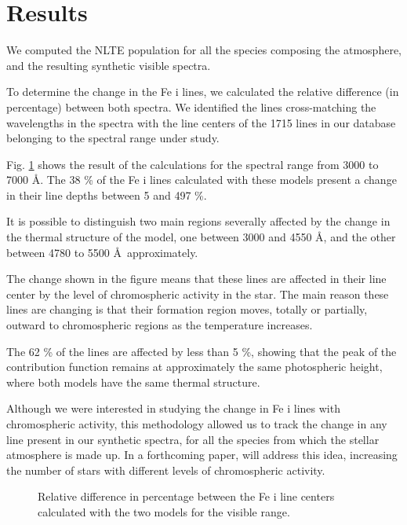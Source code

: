 \documentclass[baaa]{baaa}
\begin{document}
\section{Results}
We computed the NLTE population for all the species composing the atmosphere, and the resulting synthetic visible spectra. 

To determine the change in the Fe {\sc i} lines, we calculated the relative difference (in percentage) between both spectra. We identified the lines cross-matching the wavelengths in the spectra with the line centers of the 1715 lines in our database belonging to the spectral range under study. 

Fig. \ref{fig:diferencias} shows the result of the calculations for the spectral range from 3000 to 7000 \AA. 
The 38 \% of the Fe {\sc i} lines calculated with these models present a change in their line depths between 5 and 497 \%. 

It is possible to distinguish two main regions severally affected by the change in the thermal structure of the model, one between 3000 and 4550 \AA, and the other between 4780 to 5500 \AA ~approximately. 

The change shown in the figure means that these lines are affected in their line center by the level of chromospheric activity in the star. The main reason these lines are changing is that their formation region  moves, totally or partially, outward to chromospheric regions as the temperature increases. 

The 62 \% of the lines are affected by less than 5 \%, showing that the peak of the contribution function remains at approximately the same photospheric height, where both models have the same thermal structure.

Although we were interested in studying the change in Fe {\sc i} lines with chromospheric activity, this methodology allowed us to track the change in any line present in our synthetic spectra, for all the species from which the stellar atmosphere is made up. In a forthcoming paper, \cite{viey24} will address this idea, increasing the number of stars with different levels of chromospheric activity. 

\begin{figure}[t]
\centering
{}
\caption{Relative difference in percentage between the Fe {\sc i} line centers calculated with the two models for the visible range.}
\label{fig:diferencias}
\end{figure}
\end{document}
